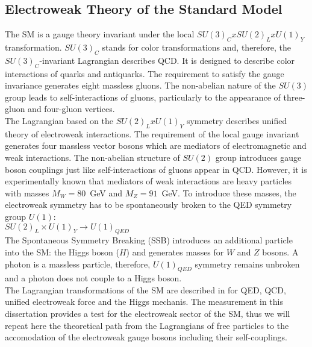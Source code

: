 \subsection{Electroweak Theory of the Standard Model}
\label{sec:WgAbout_SMEWK}


The SM is a gauge theory invariant under the local $SU(3)_C x SU(2)_L x U(1)_Y$ transformation. $SU(3)_C$ stands for color transformations and, therefore, the $SU(3)_C$-invariant Lagrangian describes QCD. It is designed to describe color interactions of quarks and antiquarks. The requirement to satisfy the gauge invariance generates eight massless gluons. The non-abelian nature of the $SU(3)$ group leads to self-interactions of gluons, particularly to the appearance of three-gluon and four-gluon vertices.\\

The Lagrangian based on the $SU(2)_L x U(1)_Y$ symmetry describes unified theory of electroweak interactions. The requirement of the local gauge invariant generates four massless vector bosons which are mediators of electromagnetic and weak interactions. The non-abelian structure of $SU(2)$ group introduces gauge boson couplings just like self-interactions of gluons appear in QCD. However, it is experimentally known that mediators of weak interactions are heavy particles with masses $M_W=80$~GeV and $M_Z=91$~GeV. To introduce these masses, the electroweak symmetry has to be spontaneously broken to the QED symmetry group $U(1)$:\\

$SU(2)_L \times U(1)_Y \rightarrow U(1)_{QED}$\\

The Spontaneous Symmetry Breaking (SSB) introduces an additional particle into the SM: the Higgs boson ($H$) and generates masses for $W$ and $Z$ bosons. A photon is a massless particle, therefore, $U(1)_{QED}$ symmetry remains unbroken and a photon does not couple to a Higgs boson.\\

The Lagrangian transformations of the SM are described in \cite{ref_Pich} for QED, QCD, unified electroweak force and the Higgs mechanis. The measurement in this dissertation provides a test for the electroweak sector of the SM, thus we will repeat here the theoretical path from the Lagrangians of free particles to the accomodation of the electroweak gauge bosons including their self-couplings.\\


